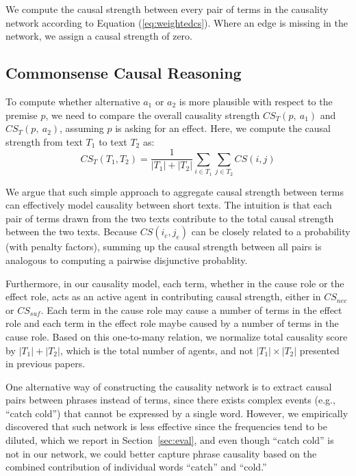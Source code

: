 \documentclass[letterpaper]{article}
\newcommand{\eqnref}[1]{Equation (\ref{#1})}
\begin{document}
We compute the causal strength between every pair of terms in the
causality network
according to \eqnref{eq:weightedcs}. Where an edge is missing in the network,
we assign a causal strength of zero.

\subsection{Commonsense Causal Reasoning}
\label{sec:reasoning}

To compute whether alternative $a_1$ or $a_2$ is more plausible
with respect to the premise $p$, we need to compare the overall causality
strength $CS_T(p,~a_1)$ and $CS_T(p,~a_2)$, assuming $p$ is asking
for an effect. Here, we compute the causal strength from
text $T_1$ to text $T_2$ as:
\begin{equation}
CS_T(T_1,T_2)=\frac{1}{|T_1|+|T_2|}\sum_{i \in T_1}\sum_{j \in T_2}
CS(i, j)
\label{eq:csall}
\end{equation}

We argue that such simple approach to aggregate causal strength between terms
can effectively model causality between short texts.
The intuition is that each pair of terms drawn from the two texts contribute
to the total causal strength between the two texts. Because $CS(i_c, j_e)$
can be closely related to a probability (with penalty factors),
summing up the causal strength between all pairs is analogous to
computing a pairwise disjunctive probablity.

Furthermore, in our causality model, each term, whether in the cause role
or the effect role, acts as an active agent in contributing causal strength,
either in $CS_{nec}$ or $CS_{suf}$. Each term in the cause role may
cause a number of terms in the effect role and each term in the effect role
maybe caused by a number of terms in the cause role.
Based on this one-to-many relation, we normalize total causality score by
$|T_1|+|T_2|$, which is the total number of agents,
and not $|T_1|\times|T_2|$ presented in previous papers.

One alternative way of constructing the causality network is to extract
causal pairs between phrases instead of terms, since there exists complex
events (e.g., ``catch cold'') that cannot be expressed by a single word.
However, we empirically discovered that such network is less
effective since the frequencies tend to be diluted,
which we report in Section~\ref{sec:eval}, and even though ``catch cold''
is not in our network, we could better capture
phrase causality based on the combined contribution of individual words
``catch'' and ``cold.''
\end{document}
